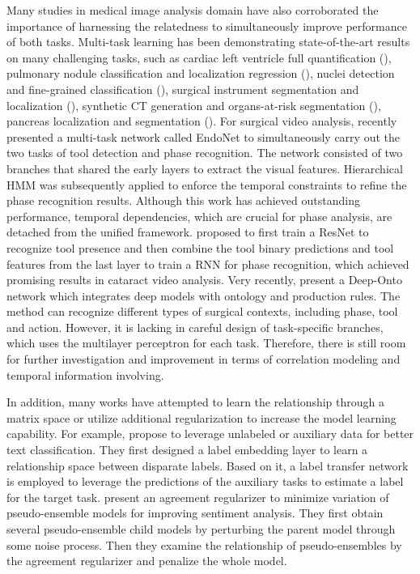 \documentclass{elsarticle}
\begin{document}
Many studies in medical image analysis domain have also corroborated the importance of harnessing the relatedness to simultaneously improve performance of both tasks.
Multi-task learning has been demonstrating state-of-the-art results on many challenging tasks, 
such as cardiac left ventricle full quantification (\cite{xue2017full}), pulmonary nodule classification and localization regression (\cite{dou2017automated}), nuclei detection and fine-grained classification (\cite{zhou2017sfcn}), surgical instrument segmentation and localization (\cite{laina2017concurrent}), synthetic CT generation and organs-at-risk segmentation (\cite{bragmanmulti}), pancreas localization and segmentation (\cite{roth2018spatial}).
For surgical video analysis, \cite{twinanda2017endonet} recently presented a multi-task network called EndoNet to simultaneously carry out the two tasks of tool detection and phase recognition.
The network consisted of two branches that shared the early layers to extract the visual features.
Hierarchical HMM was subsequently applied to enforce the temporal constraints to refine the phase recognition results.
Although this work has achieved outstanding performance, temporal dependencies, which are crucial for phase analysis, are detached from the unified framework.
\cite{zisimopoulos2018deepphase} proposed to first train a ResNet to recognize tool presence and then combine the tool binary predictions and tool features from the last layer to train a RNN for phase recognition, which achieved promising results in cataract video analysis. 
Very recently, \cite{nakawala2019deep} present a Deep-Onto network which integrates deep models with ontology and production rules.
The method can recognize different types of surgical contexts, including phase, tool and action.
However, it is lacking in careful design of task-specific branches, which uses the multilayer perceptron for each task.
Therefore, there is still room for further investigation and improvement in terms of correlation modeling and temporal information involving.


In addition, many works have attempted to learn the relationship through a matrix space or utilize additional regularization to increase the model learning capability.
For example, \cite{augenstein2018multi} propose to leverage unlabeled or auxiliary data for better text classification. They first designed a label embedding layer to learn a relationship space between disparate labels. Based on it, a label transfer network is employed to leverage the predictions of the auxiliary tasks to estimate a label for the target task.
\cite{bachman2014learning} present an agreement regularizer to minimize variation of pseudo-ensemble models for improving sentiment analysis. They first obtain several pseudo-ensemble child models by perturbing the parent model through some noise process. Then they examine the relationship of pseudo-ensembles by the agreement regularizer and penalize the whole model.
\end{document}
